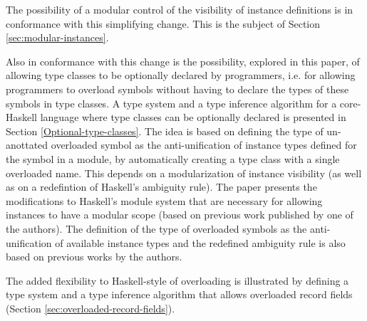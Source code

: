 The possibility of a modular control of the visibility of instance
definitions is in conformance with this simplifying change. This is
the subject of Section \ref{sec:modular-instances}.

Also in conformance with this change is the possibility, explored in
this paper, of allowing type classes to be optionally declared by
programmers, i.e. for allowing programmers to overload symbols without
having to declare the types of these symbols in type classes. A type
system and a type inference algorithm for a core-Haskell language
where type classes can be optionally declared is presented in Section
\ref{Optional-type-classes}.  The idea is based on defining the type
of un-anottated overloaded symbol as the anti-unification of instance
types defined for the symbol in a module, by automatically creating a
type class with a single overloaded name. This depends on a
modularization of instance visibility (as well as on a redefintion of
Haskell's ambiguity rule).  The paper presents the modifications to
Haskell's module system that are necessary for allowing instances to
have a modular scope (based on previous work published by one of the
authors). The definition of the type of overloaded symbols as the
anti-unification of available instance types and the redefined
ambiguity rule is also based on previous works by the authors.

The added flexibility to Haskell-style of overloading is illustrated
by defining a type system and a type inference algorithm that allows
overloaded record fields (Section \ref{sec:overloaded-record-fields}).


